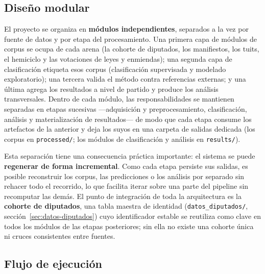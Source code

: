 \subsection{Diseño modular}
\label{sec:arq-modular}

El proyecto se organiza en \textbf{módulos independientes}, separados a la vez
por fuente de datos y por etapa del procesamiento. Una primera capa de módulos
de corpus se ocupa de cada arena (la cohorte de diputados, los manifiestos, los
tuits, el hemiciclo y las votaciones de leyes y enmiendas); una segunda capa de
clasificación etiqueta esos corpus (clasificación supervisada y modelado
exploratorio); una tercera valida el método contra referencias externas; y una
última agrega los resultados a nivel de partido y produce los análisis
transversales. Dentro de cada módulo, las responsabilidades se mantienen
separadas en etapas sucesivas ---adquisición y preprocesamiento, clasificación,
análisis y materialización de resultados--- de modo que cada etapa consume los
artefactos de la anterior y deja los suyos en una carpeta de salidas dedicada
(los corpus en \texttt{processed/}; los módulos de clasificación y análisis en
\texttt{results/}).

Esta separación tiene una consecuencia práctica importante: el sistema se puede
\textbf{regenerar de forma incremental}. Como cada etapa persiste sus salidas, es
posible reconstruir los corpus, las predicciones o los análisis por separado sin
rehacer todo el recorrido, lo que facilita iterar sobre una parte del pipeline
sin recomputar las demás. El punto de integración de toda la arquitectura es la
\textbf{cohorte de diputados}, una tabla maestra de identidad
(\texttt{datos\_diputados/}, sección~\ref{sec:datos-diputados}) cuyo
identificador estable se reutiliza como clave en todos los módulos de las etapas
posteriores; sin ella no existe una cohorte única ni cruces consistentes entre
fuentes.

\subsection{Flujo de ejecución}
\label{sec:arq-flujo}

